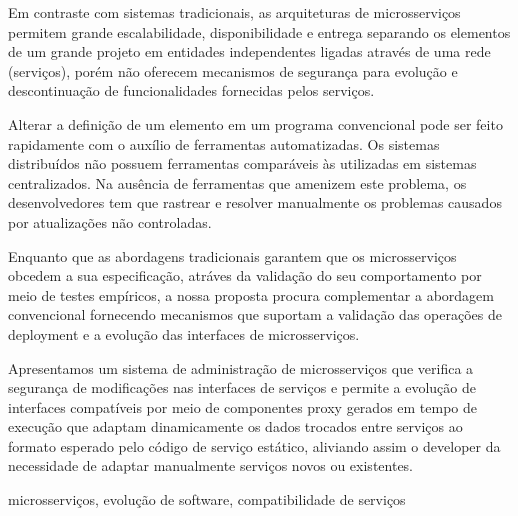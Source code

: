 
%

Em contraste com sistemas tradicionais, as arquiteturas de microsserviços permitem grande
escalabilidade, disponibilidade e entrega separando os elementos de um grande projeto em entidades independentes ligadas através de uma rede (serviços), porém não oferecem
mecanismos de segurança para evolução e descontinuação de funcionalidades fornecidas pelos serviços.

Alterar a definição de um elemento em um programa convencional pode ser feito rapidamente com o auxílio de ferramentas automatizadas.
Os sistemas distribuídos não possuem ferramentas comparáveis às utilizadas em sistemas centralizados.
Na ausência de ferramentas que amenizem este problema,
os desenvolvedores tem que rastrear e resolver manualmente os problemas causados por atualizações não controladas.

Enquanto que as abordagens tradicionais garantem que os microsserviços obcedem a sua especificação, atráves da validação do seu comportamento por meio de testes empíricos,
a nossa proposta procura complementar a abordagem convencional fornecendo mecanismos que suportam a validação das operações de deployment e a evolução das interfaces de microsserviços.

Apresentamos um sistema de administração de microsserviços que verifica a segurança de modificações nas interfaces de serviços
e permite a evolução de interfaces compatíveis por meio de componentes proxy gerados em tempo de execução
que adaptam dinamicamente os dados trocados entre serviços ao formato esperado pelo código de serviço estático,
aliviando assim o developer da necessidade de adaptar manualmente serviços novos ou existentes.

\begin{keywords}
    microsserviços, evolução de software, compatibilidade de serviços
\end{keywords}
